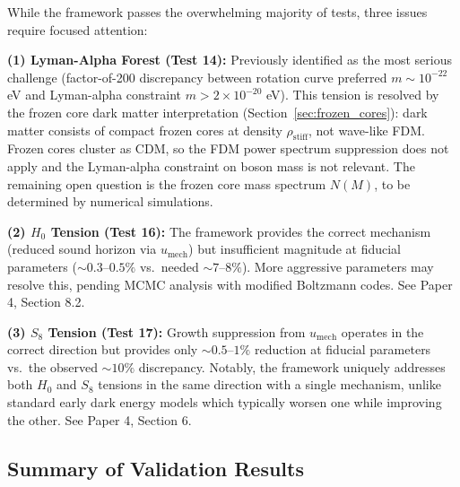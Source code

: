 \documentclass[11pt,a4paper]{article}
\newcommand{\rhostiff}{\ensuremath{\rho_{\mathrm{stiff}}}}
\newcommand{\umech}{\ensuremath{u_{\mathrm{mech}}}}
\theoremstyle{definition}
\theoremstyle{remark}
\begin{document}
While the framework passes the overwhelming majority of tests, three issues require focused attention:

\textbf{(1) Lyman-Alpha Forest (Test 14):} Previously identified as the most serious challenge (factor-of-200 discrepancy between rotation curve preferred $m \sim 10^{-22}$ eV and Lyman-alpha constraint $m > 2 \times 10^{-20}$ eV). This tension is resolved by the frozen core dark matter interpretation (Section~\ref{sec:frozen_cores}): dark matter consists of compact frozen cores at density $\rhostiff$, not wave-like FDM. Frozen cores cluster as CDM, so the FDM power spectrum suppression does not apply and the Lyman-alpha constraint on boson mass is not relevant. The remaining open question is the frozen core mass spectrum $N(M)$, to be determined by numerical simulations.

\textbf{(2) $H_0$ Tension (Test 16):} The framework provides the correct mechanism (reduced sound horizon via $\umech$) but insufficient magnitude at fiducial parameters ($\sim 0.3$--$0.5\%$ vs.\ needed $\sim 7$--$8\%$). More aggressive parameters may resolve this, pending MCMC analysis with modified Boltzmann codes. See Paper 4, Section 8.2.

\textbf{(3) $S_8$ Tension (Test 17):} Growth suppression from $\umech$ operates in the correct direction but provides only $\sim 0.5$--$1\%$ reduction at fiducial parameters vs.\ the observed $\sim 10\%$ discrepancy. Notably, the framework uniquely addresses both $H_0$ and $S_8$ tensions in the same direction with a single mechanism, unlike standard early dark energy models which typically worsen one while improving the other. See Paper 4, Section 6.

\subsection{Summary of Validation Results}
\label{sec:validation_summary}
\end{document}
